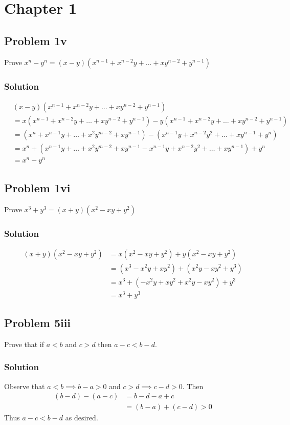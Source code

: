\section{Chapter 1}

\subsection*{Problem 1v}
Prove $x^n-y^n=(x-y)(x^{n-1}+x^{n-2}y+\ldots+xy^{n-2}+y^{n-1})$

\subsubsection*{Solution}
\begin{align*}
    &(x-y)(x^{n-1}+x^{n-2}y+\ldots+xy^{n-2}+y^{n-1})\\
    &=x(x^{n-1}+x^{n-2}y+\ldots+xy^{n-2}+y^{n-1})-y(x^{n-1}+x^{n-2}y+\ldots+xy^{n-2}+y^{n-1})\\
    &=(x^n+x^{n-1}y+\ldots+x^2y^{m-2}+xy^{n-1})-(x^{n-1}y+x^{n-2}y^2+\ldots+xy^{n-1}+y^n)\\
    &=x^n+(x^{n-1}y+\ldots+x^2y^{m-2}+xy^{n-1}-x^{n-1}y+x^{n-2}y^2+\ldots+xy^{n-1})+y^n\\
    &=x^n-y^n
\end{align*}

\subsection*{Problem 1vi}
Prove $x^3+y^3=(x+y)(x^2-xy+y^2)$

\subsubsection*{Solution}
\begin{align*}
    (x+y)(x^2-xy+y^2)&=x(x^2-xy+y^2)+y(x^2-xy+y^2)\\
    &=(x^3-x^2y+xy^2)+(x^2y-xy^2+y^3)\\
    &=x^3+(-x^2y+xy^2+x^2y-xy^2)+y^3\\
    &=x^3+y^3
\end{align*}

\subsection*{Problem 5iii}
Prove that if $a<b$ and $c>d$ then $a-c<b-d$.

\subsubsection*{Solution}
Observe that $a<b\implies b-a>0$ and $c>d\implies c-d>0$. Then
\begin{align*}
    (b-d)-(a-c)&=b-d-a+c\\
    &=(b-a)+(c-d)>0
\end{align*}
Thus $a-c<b-d$ as desired.


